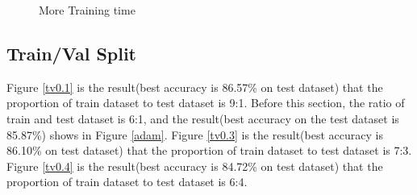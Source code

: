 \documentclass{article}
\begin{document}
\begin{figure}[!h]
{\begin{minipage}{0.21\linewidth}
  \end{minipage}
}
\quad
{}
\quad
{}
\caption{More Training time}
\label{over}
\end{figure}

\subsection{Train/Val Split}
Figure \ref{tv0.1} is the result(best accuracy is 86.57\% on test dataset) that the proportion of train dataset to test dataset is 9:1. Before this section, the ratio of train and test dataset is 6:1, and the result(best accuracy on the test dataset is 85.87\%) shows in Figure \ref{adam}. Figure \ref{tv0.3} is the result(best accuracy is 86.10\% on test dataset) that the proportion of train dataset to test dataset is 7:3.   Figure \ref{tv0.4} is the result(best accuracy is 84.72\% on test dataset) that the proportion of train dataset to test dataset is 6:4. 
\end{document}
